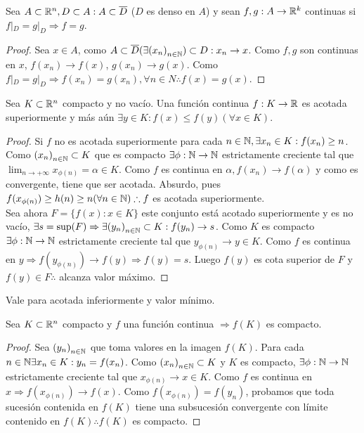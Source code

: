 \clearpage

\begin{prop}
  Sea \(A \subset \mathbb{R}^n, D \subset A : A \subset \overline{D} \) (\(D\) es denso en \(A\)) y sean \(f, g : A \to \mathbb{R}^k\) continuas si \(f|_D = g|_D \Rightarrow f=g\).

  \begin{proof}
    Sea \(x \in A\), como \(A \subset \overline{D} (\exists {(x_n)}_{n \in \mathbb{N}}) \subset D : x_n \to x\). Como \(f, g\) son continuas en \(x\), \(f(x_n) \to f(x)\), \(g(x_n) \to g(x)\). Como \(f|_D = g|_D \Rightarrow f(x_n) = g(x_n), \forall n \in N \therefore f(x) = g(x)\).
  \end{proof}
\end{prop}

\begin{theorem}[Weiertrass]
  Sea \(K \subset \mathbb{R}^n\) compacto y no vacío. Una función continua \(f: K \to \mathbb{R} \) es acotada superiormente y más aún \(\exists y \in K : f(x) \leq f(y) (\forall x \in K)\).
  \begin{proof}
    Si \(f\) no es acotada superiormente para cada \(n \in \mathbb{N}, \exists x_n \in K : f(x_n) \geq n\). Como \({(x_n)}_{n \in \mathbb{N}} \subset K\) que es compacto \(\exists \phi: \mathbb{N} \to \mathbb{N} \) estrictamente creciente tal que \(\lim_{n \to +\infty} x_{\phi(n)} = \alpha \in K\). Como \(f\) es continua en \(\alpha, f(x_n) \to f(\alpha)\) y como es convergente, tiene que ser acotada. Absurdo, pues \(f(x_{\phi(n)}) \geq h(n) \geq n (\forall n \in \mathbb{N}) \therefore f\) es acotada superiormente. \\
    Sea ahora \(F = \{ f(x) : x \in K\} \) este conjunto está acotado superiormente y es no vacío, \(\exists s = \sup(F) \Rightarrow \exists {(y_n)}_{n \in \mathbb{N}} \subset K : f(y_n) \to s\). Como \(K\) es compacto \(\exists \phi : \mathbb{N} \to \mathbb{N} \) estrictamente creciente tal que \(y_{\phi(n)} \to y \in K\). Como \(f\) es continua en \(y \Rightarrow f(y_{\phi(n)}) \to f(y) \Rightarrow f(y) = s\). Luego \(f(y)\) es cota superior de \(F\) y \(f(y) \in F \therefore \) alcanza valor máximo.
  \end{proof}
\end{theorem}

\begin{note}
  Vale para acotada inferiormente y valor mínimo.
\end{note}

\begin{theorem}
  Sea \(K \subset \mathbb{R}^n\) compacto y \(f\) una función continua \(\Rightarrow f(K)\) es compacto.
  \begin{proof}
    Sea \({(y_n)}_{n \in \mathbb{N}} \) que toma valores en la imagen \(f(K)\). Para cada \(n \in \mathbb{N} \exists x_n \in K : y_n = f(x_n)\). Como \({(x_n)}_{n \in \mathbb{N}} \subset K\) y \(K\) es compacto, \(\exists \phi : \mathbb{N} \to \mathbb{N} \) estrictamente creciente tal que \(x_{\phi(n)} \to x \in K\). Como \(f\) es continua en \(x \Rightarrow f(x_{\phi(n)}) \to f(x)\). Como \(f(x_{\phi(n)}) = f(y_n)\), probamos que toda sucesión contenida en \(f(K)\) tiene una subsucesión convergente con límite contenido en \(f(K) \therefore f(K)\) es compacto.
  \end{proof}
\end{theorem}

